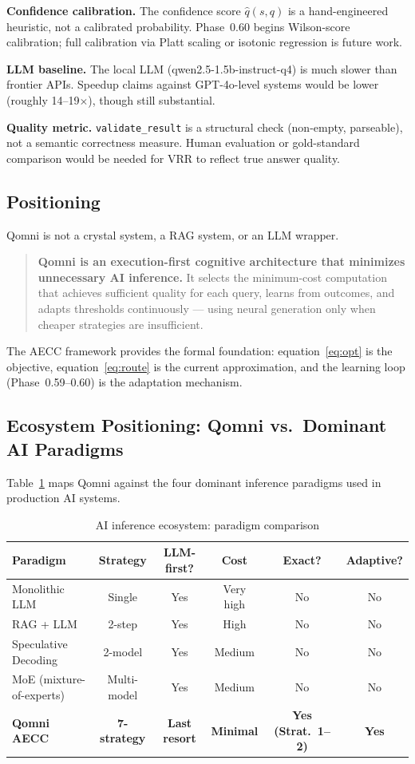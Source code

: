 \documentclass[12pt,a4paper]{article}
\begin{document}
\textbf{Confidence calibration.} The confidence score $\hat{q}(s,q)$ is a
hand-engineered heuristic, not a calibrated probability. Phase~0.60 begins
Wilson-score calibration; full calibration via Platt scaling or isotonic
regression is future work.

\textbf{LLM baseline.} The local LLM (qwen2.5-1.5b-instruct-q4) is much
slower than frontier APIs. Speedup claims against GPT-4o-level systems would
be lower (roughly 14--19$\times$), though still substantial.

\textbf{Quality metric.}
\texttt{validate\_result} is a structural check (non-empty, parseable),
not a semantic correctness measure. Human evaluation or gold-standard
comparison would be needed for VRR to reflect true answer quality.

\subsection{Positioning}

Qomni is not a crystal system, a RAG system, or an LLM wrapper.

\begin{quote}
\textbf{Qomni is an execution-first cognitive architecture that minimizes
unnecessary AI inference.} It selects the minimum-cost computation that
achieves sufficient quality for each query, learns from outcomes, and
adapts thresholds continuously --- using neural generation only when
cheaper strategies are insufficient.
\end{quote}

The AECC framework provides the formal foundation: equation~\eqref{eq:opt}
is the objective, equation~\eqref{eq:route} is the current approximation,
and the learning loop (Phase~0.59--0.60) is the adaptation mechanism.

\subsection{Ecosystem Positioning: Qomni vs.\ Dominant AI Paradigms}

Table~\ref{tab:ecosystem} maps Qomni against the four dominant inference
paradigms used in production AI systems.

\begin{table}[h]
\centering
\caption{AI inference ecosystem: paradigm comparison}
\label{tab:ecosystem}
\begin{tabular}{lccccc}
\toprule
Paradigm & Strategy & LLM-first? & Cost & Exact? & Adaptive? \\
\midrule
Monolithic LLM & Single & Yes & Very high & No & No \\
RAG + LLM & 2-step & Yes & High & No & No \\
Speculative Decoding & 2-model & Yes & Medium & No & No \\
MoE (mixture-of-experts) & Multi-model & Yes & Medium & No & No \\
\textbf{Qomni AECC} & \textbf{7-strategy} & \textbf{Last resort} & \textbf{Minimal} & \textbf{Yes (Strat.\ 1--2)} & \textbf{Yes} \\
\bottomrule
\end{tabular}
\end{table}
\end{document}
